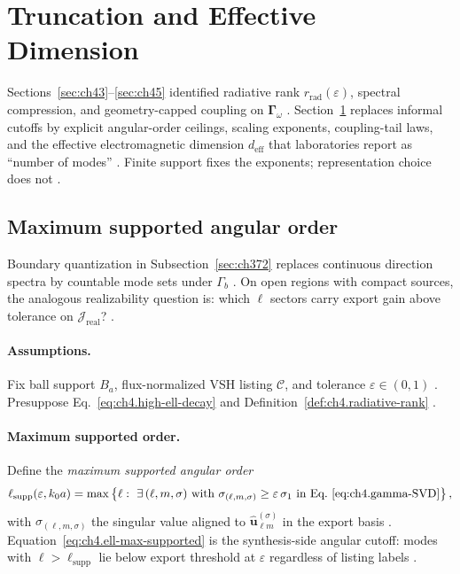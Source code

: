 ﻿\section{Truncation and Effective Dimension}
\label{sec:ch46}

Sections~\ref{sec:ch43}--\ref{sec:ch45} identified radiative rank \(r_{\mathrm{rad}}(\varepsilon)\), spectral compression, and
geometry-capped coupling on \(\boldsymbol{\Gamma}_\omega\) \cite{stratton1941,harrington2001,devaney2004}. Section~\ref{sec:ch46}
replaces informal cutoffs by explicit angular-order ceilings, scaling exponents, coupling-tail laws, and the effective
electromagnetic dimension \(d_{\mathrm{eff}}\) that laboratories report as ``number of modes'' \cite{hansen1988}. Finite support
fixes the exponents; representation choice does not \cite{jackson1999,stratton1941}.

\subsection{Maximum supported angular order}
\label{sec:ch461}

Boundary quantization in Subsection~\ref{sec:ch372} replaces continuous direction spectra by countable mode sets under
\(\Gamma_{b}\) \cite{stratton1941,harrington2001}. On open regions with compact sources, the analogous realizability question is:
which \(\ell\) sectors carry export gain above tolerance on \(\mathcal{J}_{\mathrm{real}}\)?
\cite{hansen1988,devaney2004}.

\paragraph{Assumptions.}
Fix ball support \(B_{a}\), flux-normalized VSH listing \(\mathcal{C}\), and tolerance \(\varepsilon\in(0,1)\)
\cite{stratton1941,hansen1988}. Presuppose Eq.~\eqref{eq:ch4.high-ell-decay} and Definition~\ref{def:ch4.radiative-rank}
\cite{harrington2001,devaney2004}.

\paragraph{Maximum supported order.}
Define the \emph{maximum supported angular order}
\begin{equation}
\label{eq:ch4.ell-max-supported}
\ell_{\mathrm{supp}}(\varepsilon,k_{0}a)
=
\max\left\{
\ell:\ \exists\,(\ell,m,\sigma)\ \text{with}\ 
\sigma_{(\ell,m,\sigma)}\ge\varepsilon\,\sigma_{1}
\ \text{in Eq.~\eqref{eq:ch4.gamma-SVD}}
\right\},
\end{equation}
with \(\sigma_{(\ell,m,\sigma)}\) the singular value aligned to \(\widehat{\mathbf{u}}_{\ell m}^{(\sigma)}\) in the export basis
\cite{harrington2001,hansen1988}. Equation~\eqref{eq:ch4.ell-max-supported} is the synthesis-side angular cutoff: modes with
\(\ell>\ell_{\mathrm{supp}}\) lie below export threshold at \(\varepsilon\) regardless of listing labels
\cite{stratton1941,devaney2004}.

